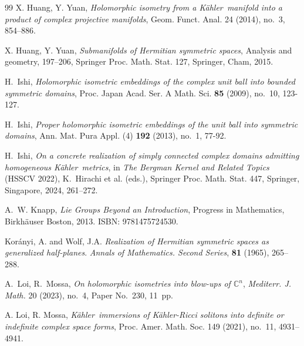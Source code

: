 \documentclass[reqno]{amsart}
\newcommand{\K}{K\"{a}hler}
\begin{document}
\begin{thebibliography}{99}
 X. Huang, Y. Yuan, \emph{Holomorphic isometry from a \K\ manifold into a product of complex projective manifolds}, Geom. Funct. Anal. 24 (2014), no.~3, 854--886. 
 
 X. Huang, Y. Yuan,
 \emph{Submanifolds of Hermitian symmetric spaces}, Analysis and geometry, 197--206,
Springer Proc. Math. Stat. 127, Springer, Cham, 2015.

H.~Ishi, 
\emph{Holomorphic isometric embeddings of the complex unit ball into bounded symmetric domains}, 
Proc. Japan Acad. Ser. A Math. Sci. \textbf{85} (2009), no.~10, 123-127.

H.~Ishi, 
\emph{Proper holomorphic isometric embeddings of the unit ball into symmetric domains}, 
Ann. Mat. Pura Appl. (4) \textbf{192} (2013), no.~1, 77-92.


H.~Ishi,
\textit{On a concrete realization of simply connected complex domains admitting homogeneous \K\ metrics},
in \textit{The Bergman Kernel and Related Topics} (HSSCV 2022),
K.~Hirachi et al. (eds.),
Springer Proc. Math. Stat. 447, Springer, Singapore, 2024, 261--272.



A.~W. Knapp,
\newblock \emph{Lie Groups Beyond an Introduction},
\newblock Progress in Mathematics, Birkh\"auser Boston, 2013.
\newblock ISBN: 9781475724530.

Korányi, A.  and  Wolf, J.A. 
\emph{Realization of Hermitian symmetric spaces as generalized half-planes}. \textit{Annals of Mathematics. Second Series}, \textbf{81} (1965), 265--288.

A.~Loi, R.~Mossa,
{\em On holomorphic isometries into blow-ups of $\mathbb{C}^n$},
 \emph{Mediterr. J. Math.} 20 (2023), no.~4, Paper No.~230, 11~pp.

A. Loi, R. Mossa, \emph{\K\ immersions of \K-Ricci solitons into definite or indefinite complex space forms}, Proc. Amer. Math. Soc. 149 (2021), no.~11, 4931--4941.







\end{thebibliography}
\end{document}
